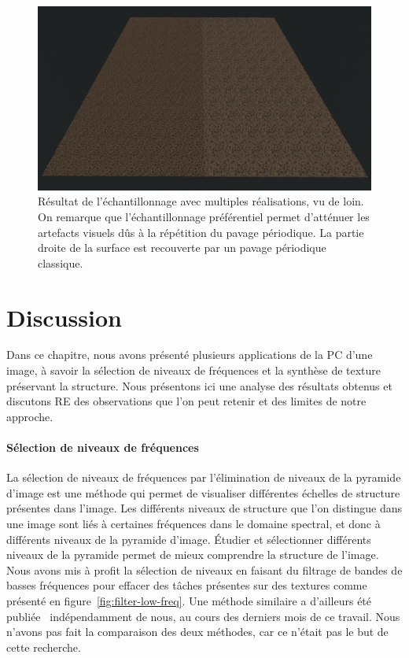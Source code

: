 \begin{figure}[t]
    \centering
    \includegraphics[width=\textwidth]{contenu/resources/images/partitioned_sampling_pc_preserving_shuffle_uv_far}
    \caption[Résultat de l'échantillonnage avec multiples réalisations, vu de loin.]{Résultat de l'échantillonnage avec multiples réalisations, vu de loin. On remarque que l'échantillonnage préférentiel permet d'atténuer les artefacts visuels dûs à la répétition du pavage périodique. La partie droite de la surface est recouverte par un pavage périodique classique.}
    \label{fig:pc-preserving-synthesis}
\end{figure}

\section{Discussion}

Dans ce chapitre, nous avons présenté plusieurs applications de la PC d'une image, à savoir la sélection de niveaux de fréquences et la synthèse de texture préservant la structure. Nous présentons ici une analyse des résultats obtenus et discutons RE des observations que l'on peut retenir et des limites de notre approche.

\paragraph{Sélection de niveaux de fréquences}

La sélection de niveaux de fréquences par l'élimination de niveaux de la pyramide d'image est une méthode qui permet de visualiser différentes échelles de structure présentes dans l'image. Les différents niveaux de structure que l'on distingue dans une image sont liés à certaines fréquences dans le domaine spectral, et donc à différents niveaux de la pyramide d'image. Étudier et sélectionner différents niveaux de la pyramide permet de mieux comprendre la structure de l'image. Nous avons mis à profit la sélection de niveaux en faisant du filtrage de bandes de basses fréquences pour effacer des \og tâches \fg présentes sur des textures comme présenté en figure~\ref{fig:filter-low-freq}. Une méthode similaire a d'ailleurs été publiée~\cite{zhang_pyramid_2023} indépendamment de nous, au cours des derniers mois de ce travail. Nous n'avons pas fait la comparaison des deux méthodes, car ce n'était pas le but de cette recherche.


